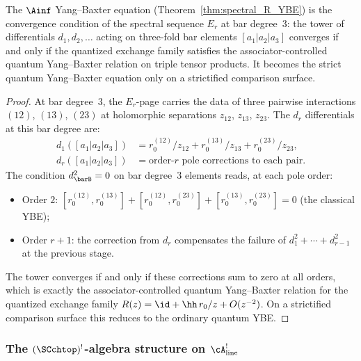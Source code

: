 \begin{corollary}
\label{cor:ainfty-ybe-as-convergence}
The $\Ainf$ Yang--Baxter equation
(Theorem~\ref{thm:spectral_R_YBE}) is the convergence condition
of the spectral sequence $E_r$ at bar degree~$3$: the tower of
differentials $d_1, d_2, \ldots$ acting on three-fold bar
elements $[a_1 | a_2 | a_3]$ converges if and only if the quantized
exchange family satisfies the associator-controlled quantum
Yang--Baxter relation on triple tensor products. It becomes the strict
quantum Yang--Baxter equation only on a strictified comparison surface.
\end{corollary}

\begin{proof}
At bar degree~$3$, the $E_r$-page carries the data of three
pairwise interactions $(12)$, $(13)$, $(23)$ at holomorphic
separations $z_{12}$, $z_{13}$, $z_{23}$. The $d_r$
differentials at this bar degree are:
\begin{align*}
d_1([a_1 | a_2 | a_3])
&= r_0^{(12)}/z_{12} + r_0^{(13)}/z_{13}
 + r_0^{(23)}/z_{23}, \\
d_r([a_1 | a_2 | a_3])
&= \text{order-$r$ pole corrections to each pair}.
\end{align*}
The condition $d_{\barB}^2 = 0$ on bar degree~$3$
elements reads, at each pole order:
\begin{itemize}
\item Order $2$: $[r_0^{(12)}, r_0^{(13)}]
 + [r_0^{(12)}, r_0^{(23)}]
 + [r_0^{(13)}, r_0^{(23)}] = 0$
 \quad (the classical YBE);
\item Order $r+1$: the correction from $d_r$ compensates
 the failure of $d_1^2 + \cdots + d_{r-1}^2$ at the previous
 stage.
\end{itemize}
The tower converges if and only if these corrections sum to zero at all
orders, which is exactly the associator-controlled quantum
Yang--Baxter relation for the quantized exchange family
\(R(z)=\id+\hh\,r_0/z+O(z^{-2})\). On a strictified comparison surface
this reduces to the ordinary quantum YBE.
\end{proof}

\subsubsection*{The $(\SCchtop)^{!}$-algebra structure on $\cA^!_{\mathrm{line}}$}

